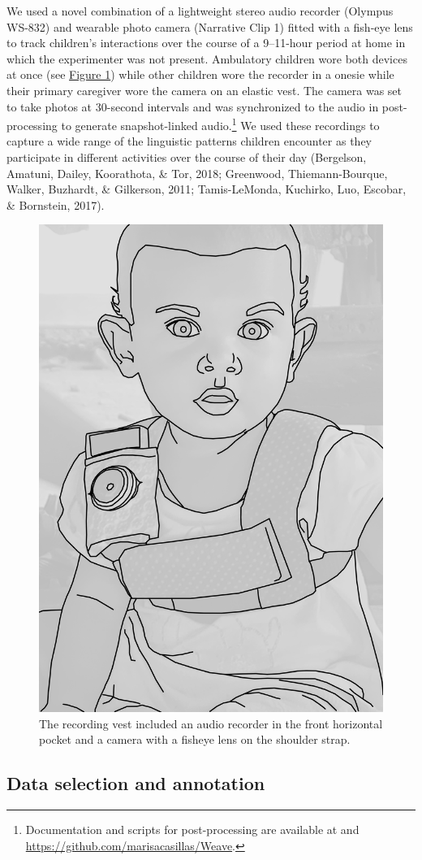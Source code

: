 \documentclass[floatsintext,man]{apa6}
\theoremstyle{definition}
\theoremstyle{definition}
\theoremstyle{definition}
\theoremstyle{remark}
\begin{document}
We used a novel combination of a lightweight stereo audio recorder
(Olympus WS-832) and wearable photo camera (Narrative Clip 1) fitted
with a fish-eye lens to track children's interactions over the course of
a 9--11-hour period at home in which the experimenter was not present.
Ambulatory children wore both devices at once (see
\protect\hyperlink{fig1}{Figure 1}) while other children wore the
recorder in a onesie while their primary caregiver wore the camera on an
elastic vest. The camera was set to take photos at 30-second intervals
and was synchronized to the audio in post-processing to generate
snapshot-linked audio.\footnote{Documentation and scripts for
  post-processing are available at and
  \url{https://github.com/marisacasillas/Weave}.} We used these
recordings to capture a wide range of the linguistic patterns children
encounter as they participate in different activities over the course of
their day (Bergelson, Amatuni, Dailey, Koorathota, \& Tor, 2018;
Greenwood, Thiemann-Bourque, Walker, Buzhardt, \& Gilkerson, 2011;
Tamis-LeMonda, Kuchirko, Luo, Escobar, \& Bornstein, 2017).

\begin{figure}

{\centering \includegraphics[width=0.5\linewidth]{Tseltal-CLE_files/TseltalCLE-RecordingVest} 

}

\caption{The recording vest included an audio recorder in the front horizontal pocket and a camera with a fisheye lens on the shoulder strap.}\label{fig:fig1}
\end{figure}

\subsection{Data selection and annotation}\label{methods-samples}
\end{document}
